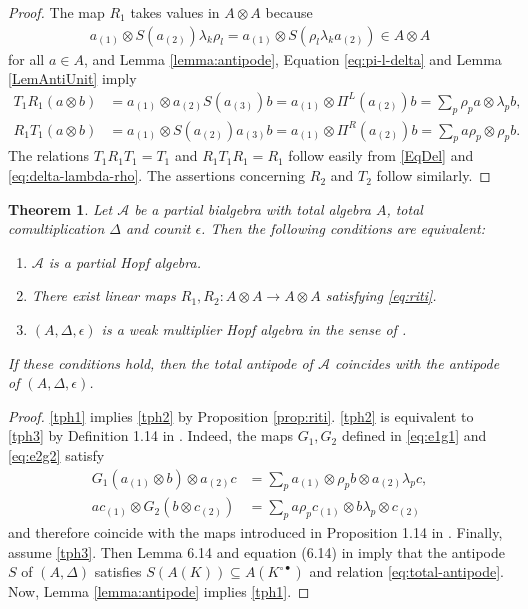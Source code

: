 \documentclass[10pt]{article}
\newtheorem{Theorem}{Theorem}[section]
\theoremstyle{definition}
\numberwithin{equation}{section}
\begin{document}
\begin{proof}
  The map $R_{1}$ takes values in $A\otimes A$ because
  \begin{align*}
  a_{(1)} \otimes
  S(a_{(2)})\lambda_{k}\rho_{l} =  a_{(1)} \otimes S(\rho_{l}\lambda_{k}a_{(2)}) \in A
  \otimes A
  \end{align*}
  for all $a\in A$, and Lemma
  \ref{lemma:antipode},  Equation \eqref{eq:pi-l-delta} and Lemma \ref{LemAntiUnit} imply
  \begin{align*}
    T_{1}R_{1}(a \otimes b)&= a_{(1)} \otimes a_{(2)}S(a_{(3)})b =
    a_{(1)} \otimes \Pi^{L}(a_{(2)})b =
    \sum_{p} \rho_{p}a \otimes \lambda_{p}b, \\
    R_{1}T_{1}(a \otimes b) &= a_{(1)} \otimes S(a_{(2)})a_{(3)}b =
    a_{(1)} \otimes \Pi^{R}(a_{(2)})b = \sum_{p} a\rho_{p}\otimes
    \rho_{p}b.
  \end{align*}
 The relations $T_{1}R_{1}T_{1}=T_{1}$ and
$R_{1}T_{1}R_{1}=R_{1}$ follow easily from  \eqref{EqDel} and
\eqref{eq:delta-lambda-rho}. The assertions concerning $R_{2}$ and
$T_{2}$ follow similarly.
\end{proof}
\begin{Theorem}  \label{theorem:partial-hopf-algebra}
  Let $\mathscr{A}$ be a partial bialgebra with total algebra $A$,
  total comultiplication $\Delta$ and counit $\epsilon$. Then the
  following conditions are equivalent:
  \begin{enumerate}[label={(\arabic*)}]
  \item\label{tph1} $\mathscr{A}$ is a partial Hopf algebra.
  \item\label{tph2} There exist linear maps $R_{1},R_{2} \colon A\otimes A\to
    A\otimes A$ satisfying  \eqref{eq:riti}.
  \item\label{tph3} $(A,\Delta,\epsilon)$  is a weak multiplier Hopf algebra in the sense of \cite{VDW1}.
  \end{enumerate}
  If these conditions hold, then the total  antipode of $\mathscr{A}$ coincides with the antipode of $(A,\Delta,\epsilon)$.
\end{Theorem}
\begin{proof}
\ref{tph1} implies \ref{tph2} by Proposition \ref{prop:riti}. \ref{tph2} is equivalent to \ref{tph3} by Definition
1.14 in \cite{VDW1}. Indeed, the maps $G_{1},G_{2}$ defined in \eqref{eq:e1g1} and \eqref{eq:e2g2} satisfy
\begin{align*}
  G_{1}(a_{(1)} \otimes b) \otimes a_{(2)}c &= \sum_{p} a_{(1)} \otimes \rho_{p}b
  \otimes a_{(2)}\lambda_{p}c, \\
  ac_{(1)} \otimes G_{2}(b\otimes c_{(2)}) &=\sum_{p} a\rho_{p}c_{(1)} \otimes b\lambda_{p} \otimes c_{(2)}
\end{align*}
and therefore coincide with the maps introduced in Proposition 1.14 in
\cite{VDW1}.  Finally, assume \ref{tph3}. Then
 Lemma 6.14 and equation (6.14) in \cite{Boh1} imply that the antipode
$S$ of $(A,\Delta)$ satisfies $S(A(K))\subseteq A(K^{\circ\bullet})$ and relation \eqref{eq:total-antipode}.  Now, Lemma \ref{lemma:antipode} implies \ref{tph1}.
\end{proof}
\end{document}
